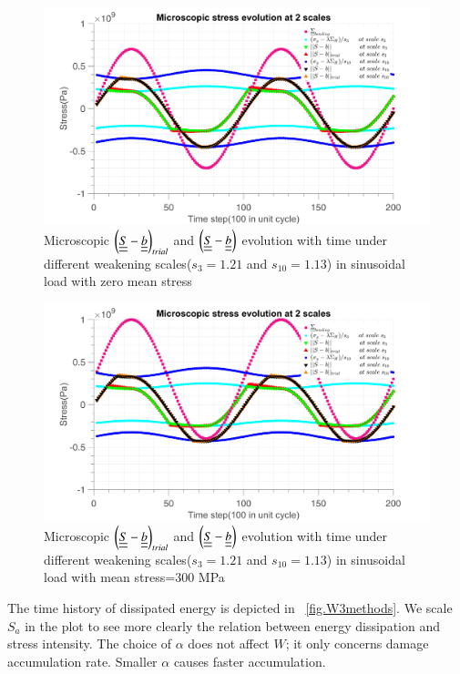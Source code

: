 \documentclass[3p,times,procedia,number]{elsarticle}
\newcommand{\figref}[1]{\figurename~\ref{#1}}
\begin{document}
\begin{figure}[!h]
	\centering
	\includegraphics[width=\textwidth]{figures//trialsin_0.png} 
	\caption{Microscopic $\left(  \uline{\uline{S}}-\uline{\uline{b}}\right)_{trial}$ and $\left( \uline{\uline{S}}-\uline{\uline{b}}\right)$ evolution with time under different weakening scales($s_{3}=1.21$ and $s_{10}=1.13$) in sinusoidal load with zero mean stress}
	\label{fig.trialsin0}
\end{figure}
\begin{figure}[!h]
	\centering
	\includegraphics[width=\textwidth]{figures//trialsin_m.png} 
	\caption{Microscopic $\left(  \uline{\uline{S}}-\uline{\uline{b}}\right)_{trial}$ and $\left( \uline{\uline{S}}-\uline{\uline{b}}\right)$ evolution with time under different weakening scales($s_{3}=1.21$ and $s_{10}=1.13$) in sinusoidal load with mean stress=300 MPa}
	\label{fig.trialsinm}
\end{figure}

The time history of dissipated energy is depicted in \figref{fig.W3methods}. We scale $S_{a}$ in the plot to see more clearly the relation between energy dissipation and stress intensity. The choice of $\alpha$ does not affect $W$; it only concerns damage accumulation rate. Smaller $\alpha$ causes faster accumulation.
\end{document}
